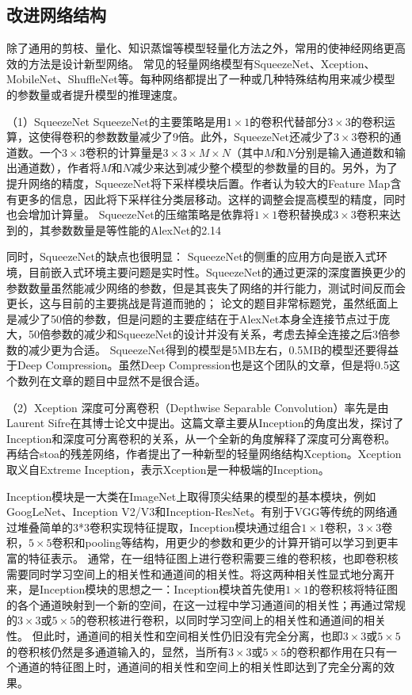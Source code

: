 \subsection{改进网络结构}
除了通用的剪枝、量化、知识蒸馏等模型轻量化方法之外，常用的使神经网络更高效的方法是设计新型网络。
常见的轻量网络模型有SqueezeNet、Xception、MobileNet、ShuffleNet等。每种网络都提出了一种或几种特殊结构用来减少模型的参数量或者提升模型的推理速度。

（1）SqueezeNet
SqueezeNet的主要策略是用$1\times1$的卷积代替部分$3\times3$的卷积运算，这使得卷积的参数数量减少了9倍。此外，SqueezeNet还减少了$3\times3$卷积的通道数。一个$3\times3$卷积的计算量是$3\times3 \times M \times N$（其中$M$和$N$分别是输入通道数和输出通道数），作者将$M$和$N$减少来达到减少整个模型的参数量的目的。另外，为了提升网络的精度，SqueezeNet将下采样模块后置。作者认为较大的Feature Map含有更多的信息，因此将下采样往分类层移动。这样的调整会提高模型的精度，同时也会增加计算量。
SqueezeNet的压缩策略是依靠将$1\times1$卷积替换成$3\times3$卷积来达到的，其参数数量是等性能的AlexNet的2.14%

同时，SqueezeNet的缺点也很明显：
SqueezeNet的侧重的应用方向是嵌入式环境，目前嵌入式环境主要问题是实时性。SqueezeNet的通过更深的深度置换更少的参数数量虽然能减少网络的参数，但是其丧失了网络的并行能力，测试时间反而会更长，这与目前的主要挑战是背道而驰的；
论文的题目非常标题党，虽然纸面上是减少了50倍的参数，但是问题的主要症结在于AlexNet本身全连接节点过于庞大，50倍参数的减少和SqueezeNet的设计并没有关系，考虑去掉全连接之后3倍参数的减少更为合适。
SqueezeNet得到的模型是5MB左右，0.5MB的模型还要得益于Deep Compression。虽然Deep Compression也是这个团队的文章，但是将0.5这个数列在文章的题目中显然不是很合适。

（2）Xception
深度可分离卷积（Depthwise Separable Convolution）率先是由 Laurent Sifre在其博士论文\cite{sifre2014rigid}中提出。这篇文章主要从Inception\cite{szegedy2015going}的角度出发，探讨了Inception和深度可分离卷积的关系，从一个全新的角度解释了深度可分离卷积。再结合stoa的残差网络\cite{he2016deep}，作者提出了一种新型的轻量网络结构Xception。Xception取义自Extreme Inception，表示Xception是一种极端的Inception。

Inception模块是一大类在ImageNet上取得顶尖结果的模型的基本模块，例如GoogLeNet、Inception V2/V3和Inception-ResNet。有别于VGG等传统的网络通过堆叠简单的3*3卷积实现特征提取，Inception模块通过组合$1\times1$卷积，$3\times3$卷积，$5\times5$卷积和pooling等结构，用更少的参数和更少的计算开销可以学习到更丰富的特征表示。
通常，在一组特征图上进行卷积需要三维的卷积核，也即卷积核需要同时学习空间上的相关性和通道间的相关性。将这两种相关性显式地分离开来，是Inception模块的思想之一：Inception模块首先使用$1\times1$的卷积核将特征图的各个通道映射到一个新的空间，在这一过程中学习通道间的相关性；再通过常规的$3\times3$或$5\times5$的卷积核进行卷积，以同时学习空间上的相关性和通道间的相关性。
但此时，通道间的相关性和空间相关性仍旧没有完全分离，也即$3\times3$或$5\times5$的卷积核仍然是多通道输入的，显然，当所有$3\times3$或$5\times5$的卷积都作用在只有一个通道的特征图上时，通道间的相关性和空间上的相关性即达到了完全分离的效果。

